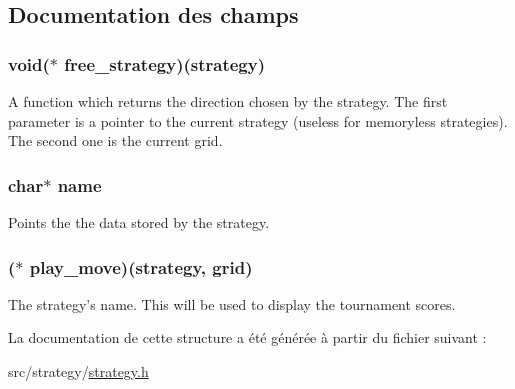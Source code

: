 \subsection{Documentation des champs}
\hypertarget{structstrategy__s_a03f512455d12943d000c8287d130ac09}{
\subsubsection[{free\_\-strategy}]{\setlength{\rightskip}{0pt plus 5cm}void($\ast$ {\bf free\_\-strategy})({\bf strategy})}}
\label{structstrategy__s_a03f512455d12943d000c8287d130ac09}
A function which returns the direction chosen by the strategy. The first parameter is a pointer to the current strategy (useless for memoryless strategies). The second one is the current grid. \hypertarget{structstrategy__s_a5ac083a645d964373f022d03df4849c8}{
\subsubsection[{name}]{\setlength{\rightskip}{0pt plus 5cm}char$\ast$ {\bf name}}}
\label{structstrategy__s_a5ac083a645d964373f022d03df4849c8}
Points the the data stored by the strategy. \hypertarget{structstrategy__s_ac4ec2cfabdd3e4b516c4164f83008809}{
\subsubsection[{play\_\-move}]{($\ast$ {\bf play\_\-move})({\bf strategy}, {\bf grid})}}
\label{structstrategy__s_ac4ec2cfabdd3e4b516c4164f83008809}
The strategy's name. This will be used to display the tournament scores. 

La documentation de cette structure a été générée à partir du fichier suivant :\begin{DoxyCompactItemize}
\item 
src/strategy/\hyperlink{strategy_8h}{strategy.h}\end{DoxyCompactItemize}
